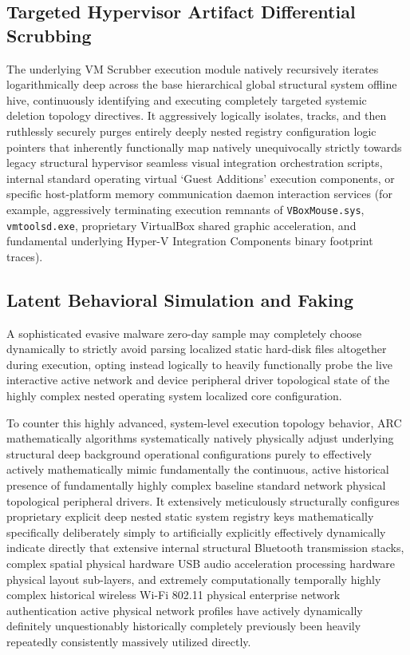\documentclass{ieeeaccess}
\begin{document}
\subsection{Targeted Hypervisor Artifact Differential Scrubbing}
The underlying VM Scrubber execution module natively recursively iterates logarithmically deep across the base hierarchical global structural system offline hive, continuously identifying and executing completely targeted systemic deletion topology directives. It aggressively logically isolates, tracks, and then ruthlessly securely purges entirely deeply nested registry configuration logic pointers that inherently functionally map natively unequivocally strictly towards legacy structural hypervisor seamless visual integration orchestration scripts, internal standard operating virtual `Guest Additions' execution components, or specific host-platform memory communication daemon interaction services (for example, aggressively terminating execution remnants of \texttt{VBoxMouse.sys}, \texttt{vmtoolsd.exe}, proprietary VirtualBox shared graphic acceleration, and fundamental underlying Hyper-V Integration Components binary footprint traces).

\subsection{Latent Behavioral Simulation and Faking}
A sophisticated evasive malware zero-day sample may completely choose dynamically to strictly avoid parsing localized static hard-disk files altogether during execution, opting instead logically to heavily functionally probe the live interactive active network and device peripheral driver topological state of the highly complex nested operating system localized core configuration. 

To counter this highly advanced, system-level execution topology behavior, ARC mathematically algorithms systematically natively physically adjust underlying structural deep background operational configurations purely to effectively actively mathematically mimic fundamentally the continuous, active historical presence of fundamentally highly complex baseline standard network physical topological peripheral drivers. It extensively meticulously structurally configures proprietary explicit deep nested static system registry keys mathematically specifically deliberately simply to artificially explicitly effectively dynamically indicate directly that extensive internal structural Bluetooth transmission stacks, complex spatial physical hardware USB audio acceleration processing hardware physical layout sub-layers, and extremely computationally temporally highly complex historical wireless Wi-Fi 802.11 physical enterprise network authentication active physical network profiles have actively dynamically definitely unquestionably historically completely previously been heavily repeatedly consistently massively utilized directly.
\end{document}
